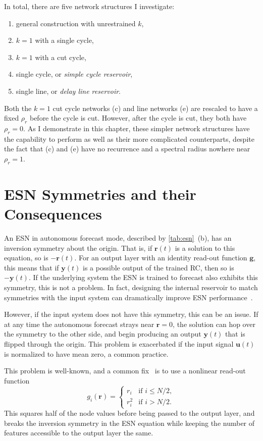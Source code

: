 In total, there are five network structures I investigate:
\begin{enumerate}[label= (\alph*)]
\item general construction with unrestrained $k$,
\item $k = 1$ with a single cycle,
\item $k = 1$ with a cut cycle,
\item single cycle, or \emph{simple cycle reservoir},
\item single line, or \emph{delay line reservoir}.
\end{enumerate}
Both the $k = 1$ cut cycle networks (c) and line networks (e) are
rescaled to have a fixed $\rho_r$ before the cycle is cut. However,
after the cycle is cut, they both have $\rho_r=0$. As I
demonstrate in this chapter, these simpler network structures have the capability to
perform as well as their more complicated counterparts, despite the
fact that (c) and (e) have no recurrence and a spectral radius nowhere
near $\rho_r = 1$.

\section{ESN Symmetries and their Consequences}

An ESN in autonomous forecast mode, described by \cref{tab:esn}~(b),
has an inversion symmetry about the origin. That is, if $\bm{r}(t)$ is
a solution to this equation, so is $-\bm{r}(t)$. For an output layer
with an identity read-out function $\bm{g}$, this means that if
$\bm{y}(t)$ is a possible output of the trained RC, then so is
$-\bm{y}(t)$. If the underlying system the ESN is trained to forecast
also exhibits this symmetry, this is not a problem. In fact, designing
the internal reservoir to match symmetries with the input system can
dramatically improve ESN performance~\cite{barbosa2021}.

However, if the input system does not have this symmetry, this can be
an issue. If at any time the autonomous forecast strays near $\bm{r} =
0$, the solution can hop over the symmetry to the other side, and
begin producing an output $\bm{y}(t)$ that is flipped through the
origin. This problem is exacerbated if the input signal $\bm{u}(t)$ is
normalized to have mean zero, a common practice.

This problem is well-known, and a common fix~\cite{pathak2017,herteux2020}
is to use a nonlinear read-out function
\begin{equation}
  g_i(\bm{r}) = \begin{cases}
    r_i & \text{if } i \leq N / 2, \\
    r_i^2 & \text{if } i > N / 2.
  \end{cases}
  \label{eq:esn-break-sym}
\end{equation}
This squares half of the node values before being passed
to the output layer, and breaks the inversion symmetry in the ESN
equation while keeping the number of features accessible to the output
layer the same.

